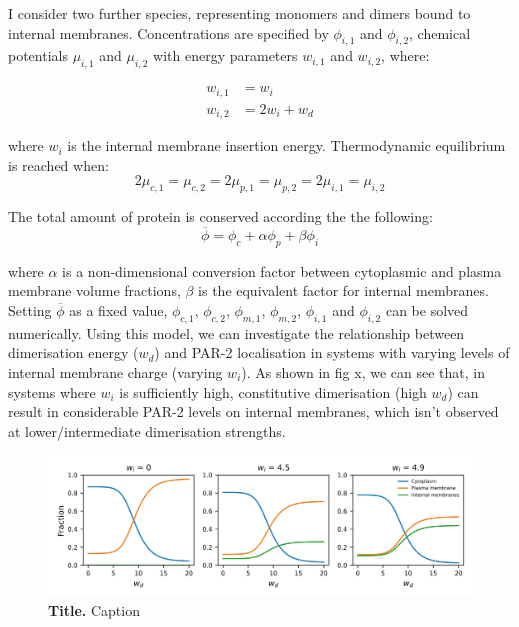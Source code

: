 \documentclass[12pt]{"article"}
\newcommand{\mycaption}[2]{\caption[#1]{\textbf{#1.} #2}}
\begin{document}
I consider two further species, representing monomers and dimers bound to internal membranes.  Concentrations are specified by $\phi_{i,1}$ and $\phi_{i,2}$, chemical potentials $\mu_{i,1}$ and $\mu_{i,2}$ with energy parameters $w_{i,1}$ and $w_{i,2}$, where:

\begin{align}
w_{i,1} &= w_i\\
w_{i,2} &= 2w_i + w_d
\end{align}

where $w_i$ is the internal membrane insertion energy. Thermodynamic equilibrium is reached when:
\begin{equation}
2\mu_{c,1} =  \mu_{c,2} = 2\mu_{p,1} =  \mu_{p,2} = 2\mu_{i,1} =  \mu_{i,2}
\end{equation}

The total amount of protein is conserved according the the following:
\begin{equation}
\overline{\phi} = \phi_c + \alpha\phi_p + \beta\phi_i
\end{equation}

where $\alpha$ is a non-dimensional conversion factor between cytoplasmic and plasma membrane volume fractions, $\beta$ is the equivalent factor for internal membranes. Setting $\overline{\phi}$ as a fixed value, $\phi_{c,1}$, $\phi_{c,2}$, $\phi_{m,1}$, $\phi_{m,2}$, $\phi_{i,1}$ and $\phi_{i,2}$ can be solved numerically. Using this model, we can investigate the relationship between dimerisation energy ($w_d$) and PAR-2 localisation in systems with varying levels of internal membrane charge (varying $w_i$). As shown in fig x, we can see that, in systems where $w_i$ is sufficiently high, constitutive dimerisation (high $w_d$) can result in considerable PAR-2 levels on internal membranes, which isn't observed at lower/intermediate dimerisation strengths. 

\begin{figure}[!h]
\includegraphics[scale=0.90]{six_species_thermodynamic}
\setlength{\abovecaptionskip}{20pt}
\centering
\mycaption{Title}{Caption}
\label{fig:six_species_thermodynamic}
\end{figure}
\end{document}
